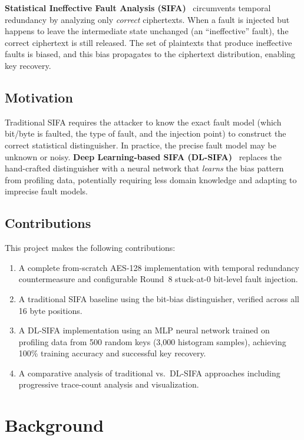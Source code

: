 \documentclass[11pt,a4paper]{article}
\begin{document}
\textbf{Statistical Ineffective Fault Analysis (SIFA)}~\cite{dobraunig2018} circumvents temporal redundancy by analyzing only \emph{correct} ciphertexts. When a fault is injected but happens to leave the intermediate state unchanged (an ``ineffective'' fault), the correct ciphertext is still released. The set of plaintexts that produce ineffective faults is biased, and this bias propagates to the ciphertext distribution, enabling key recovery.

\subsection{Motivation}

Traditional SIFA requires the attacker to know the exact fault model (which bit/byte is faulted, the type of fault, and the injection point) to construct the correct statistical distinguisher. In practice, the precise fault model may be unknown or noisy. \textbf{Deep Learning-based SIFA (DL-SIFA)}~\cite{ramezanpour2019} replaces the hand-crafted distinguisher with a neural network that \emph{learns} the bias pattern from profiling data, potentially requiring less domain knowledge and adapting to imprecise fault models.

\subsection{Contributions}

This project makes the following contributions:
\begin{enumerate}
    \item A complete from-scratch AES-128 implementation with temporal redundancy countermeasure and configurable Round~8 stuck-at-0 bit-level fault injection.
    \item A traditional SIFA baseline using the bit-bias distinguisher, verified across all 16 byte positions.
    \item A DL-SIFA implementation using an MLP neural network trained on profiling data from 500 random keys (3,000 histogram samples), achieving 100\% training accuracy and successful key recovery.
    \item A comparative analysis of traditional vs.\ DL-SIFA approaches including progressive trace-count analysis and visualization.
\end{enumerate}

\section{Background}
\end{document}
